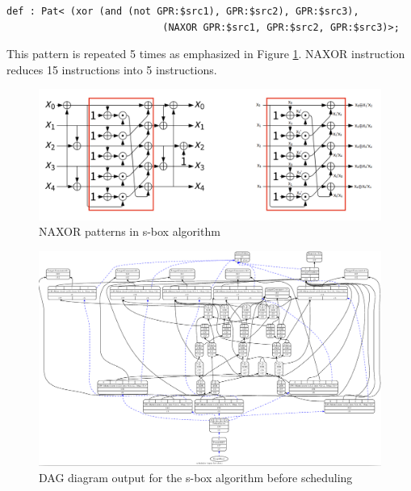 \begin{lstlisting}
def : Pat< (xor (and (not GPR:$src1), GPR:$src2), GPR:$src3),
                           (NAXOR GPR:$src1, GPR:$src2, GPR:$src3)>;
\end{lstlisting}

This pattern is repeated 5 times as emphasized in Figure \ref{fig:sbox_naxor_pattern}. NAXOR instruction reduces 15 instructions into 5 instructions.

\begin{figure}
    \centering
    \includegraphics[scale=0.3]{adding_new_instr/sbox_naxor_pattern.png}
    \caption{NAXOR patterns in s-box algorithm}
    \label{fig:sbox_naxor_pattern}
\end{figure}

\begin{figure}
    \centering
    \includegraphics[scale=0.2]{adding_new_instr/naxor_sched.png}
    \caption{DAG diagram output for the s-box algorithm before scheduling}
    \label{fig:naxor_sched_diagram}
\end{figure}

